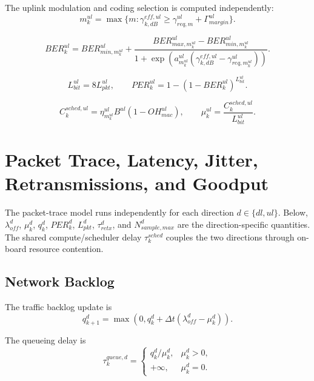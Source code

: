 \documentclass[11pt]{article}
\begin{document}
The uplink modulation and coding selection is computed independently:
\begin{equation}
  m^{ul}_k
  =
  \max\{m : \gamma^{eff,ul}_{k,dB} \ge \gamma^{ul}_{req,m} + \Gamma^{ul}_{margin}\}.
\end{equation}

\begin{equation}
  BER^{ul}_k
  =
  BER^{ul}_{min,m^{ul}_k}
  +
  \frac{BER^{ul}_{max,m^{ul}_k} - BER^{ul}_{min,m^{ul}_k}}
       {1 + \exp\left(a^{ul}_{m^{ul}_k}\left(\gamma^{eff,ul}_{k,dB} - \gamma^{ul}_{req,m^{ul}_k}\right)\right)}.
\end{equation}

\begin{equation}
  L^{ul}_{bit} = 8L^{ul}_{pkt},
  \qquad
  PER^{ul}_k = 1 - (1 - BER^{ul}_k)^{L^{ul}_{bit}}.
\end{equation}

\begin{equation}
  C^{sched,ul}_k = \eta^{ul}_{m^{ul}_k} B^{ul} (1 - OH^{ul}_{mac}),
  \qquad
  \mu^{ul}_k = \frac{C^{sched,ul}_k}{L^{ul}_{bit}}.
\end{equation}

\section{Packet Trace, Latency, Jitter, Retransmissions, and Goodput}

The packet-trace model runs independently for each direction
$d \in \{dl, ul\}$. Below, $\lambda^{d}_{off}$, $\mu^d_k$, $q^d_k$, $PER^d_k$,
$L^{d}_{pkt}$, $\tau^{d}_{retx}$, and $N^{d}_{sample,max}$ are the direction-specific
quantities. The shared compute/scheduler delay $\tau^{sched}_k$ couples the two
directions through on-board resource contention.

\subsection{Network Backlog}

The traffic backlog update is
\begin{equation}
  q^{d}_{k+1}
  =
  \max\left(0, q^{d}_k + \Delta t(\lambda^{d}_{off} - \mu^{d}_k)\right).
\end{equation}

The queueing delay is
\begin{equation}
  \tau^{queue,d}_k
  =
  \begin{cases}
    q^{d}_k / \mu^{d}_k, & \mu^{d}_k > 0, \\
    +\infty, & \mu^{d}_k = 0.
  \end{cases}
\end{equation}
\end{document}
